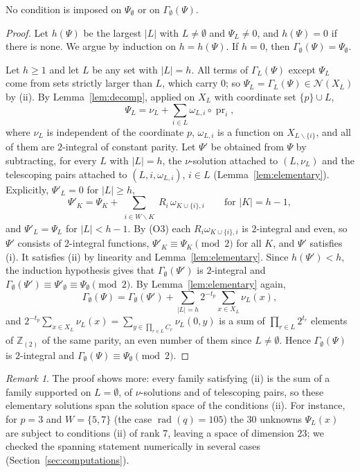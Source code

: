 \documentclass[11pt]{amsart}
\theoremstyle{definition}
\theoremstyle{remark}
\newtheorem{remark}[theorem]{Remark}
\newcommand{\Zt}{\mathbb Z_{(2)}}
\newcommand{\Nn}{\mathcal N}
\DeclareMathOperator{\rad}{rad}
\DeclareMathOperator{\pr}{pr}
\numberwithin{equation}{section}
\begin{document}
No condition is imposed on $\Psi_\emptyset$ or on $\Gamma_\emptyset(\Psi)$.

\begin{proof}
Let $h(\Psi)$ be the largest $|L|$ with $L\neq\emptyset$ and $\Psi_L\neq0$, and $h(\Psi)=0$ if there is none.
We argue by induction on $h=h(\Psi)$.
If $h=0$, then $\Gamma_\emptyset(\Psi)=\Psi_\emptyset$.

Let $h\ge1$ and let $L$ be any set with $|L|=h$.
All terms of $\Gamma_L(\Psi)$ except $\Psi_L$ come from sets strictly larger than $L$, which carry $0$; so $\Psi_L=\Gamma_L(\Psi)\in\Nn(X_L)$ by (ii).
By Lemma~\ref{lem:decomp}, applied on $X_L$ with coordinate set $\{p\}\cup L$,
\[
\Psi_L=\nu_L+\sum_{i\in L}\omega_{L,i}\circ\pr_i,
\]
where $\nu_L$ is independent of the coordinate $p$, $\omega_{L,i}$ is a function on $X_{L\smallsetminus\{i\}}$, and all of them are $2$-integral of constant parity.
Let $\Psi'$ be obtained from $\Psi$ by subtracting, for every $L$ with $|L|=h$, the $\nu$-solution attached to $(L,\nu_L)$ and the telescoping pairs attached to $(L,i,\omega_{L,i})$, $i\in L$ (Lemma~\ref{lem:elementary}).
Explicitly, $\Psi'_L=0$ for $|L|\ge h$,
\[
\Psi'_K=\Psi_K+\sum_{\substack{i\in W\smallsetminus K}}R_i\,\omega_{K\cup\{i\},i}\qquad\text{for }|K|=h-1,
\]
and $\Psi'_L=\Psi_L$ for $|L|<h-1$.
By (O3) each $R_i\omega_{K\cup\{i\},i}$ is $2$-integral and even, so $\Psi'$ consists of $2$-integral functions, $\Psi'_K\equiv\Psi_K\pmod 2$ for all $K$, and $\Psi'$ satisfies (i).
It satisfies (ii) by linearity and Lemma~\ref{lem:elementary}.
Since $h(\Psi')<h$, the induction hypothesis gives that $\Gamma_\emptyset(\Psi')$ is $2$-integral and $\Gamma_\emptyset(\Psi')\equiv\Psi'_\emptyset\equiv\Psi_\emptyset\pmod 2$.
By Lemma~\ref{lem:elementary} again,
\[
\Gamma_\emptyset(\Psi)=\Gamma_\emptyset(\Psi')+\sum_{|L|=h}2^{-t_p}\sum_{x\in X_L}\nu_L(x),
\]
and $2^{-t_p}\sum_{x\in X_L}\nu_L(x)=\sum_{y\in\prod_{r\in L}C_r}\nu_L(0,y)$ is a sum of $\prod_{r\in L}2^{t_r}$ elements of $\Zt$ of the same parity, an even number of them since $L\neq\emptyset$.
Hence $\Gamma_\emptyset(\Psi)$ is $2$-integral and $\Gamma_\emptyset(\Psi)\equiv\Psi_\emptyset\pmod2$.
\end{proof}

\begin{remark}\label{rem:span}
The proof shows more: every family satisfying (ii) is the sum of a family supported on $L=\emptyset$, of $\nu$-solutions and of telescoping pairs, so these elementary solutions span the solution space of the conditions (ii).
For instance, for $p=3$ and $W=\{5,7\}$ (the case $\rad(q)=105$) the $30$ unknowns $\Psi_L(x)$ are subject to conditions (ii) of rank $7$, leaving a space of dimension $23$; we checked the spanning statement numerically in several cases (Section~\ref{sec:computations}).
\end{remark}
\end{document}
